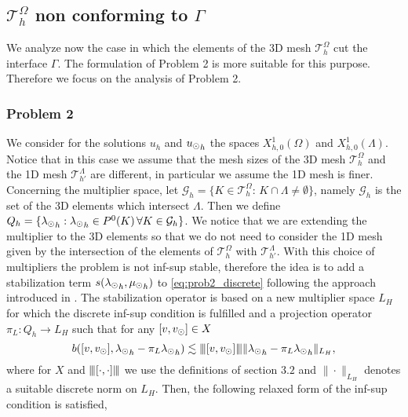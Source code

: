 \def\patch{\omega _j}
\subsection{$\mathcal{T}^{\Omega}_h$ non conforming to $\Gamma$} \label{sec:unfit2}
We analyze now the case in which the elements of the 3D mesh $\mathcal{T}^{\Omega}_h$ cut the interface $\Gamma$. The formulation of Problem 2 is more suitable for this purpose. 
Therefore we focus on the analysis of Problem 2.

\subsubsection{Problem 2} We consider for the solutions $u_h$ and ${u_{\odot}}_h$ the spaces $X_{h,0}^1(\Omega)$ and $X_{h,0}^1(\Lambda)$. Notice that in this case we assume that the mesh sizes of the 3D mesh $\mathcal{T}^{\Omega}_h$ and the 1D mesh $\mathcal{T}^{\Lambda}_{h'}$ are different, in particular we assume the 1D mesh is finer. Concerning the multiplier space, let $\mathcal{G}_h = \{K \in \mathcal{T}^{\Omega}_h: \, K\cap \Lambda \neq \emptyset\}$, namely $\mathcal{G}_h$ is the set of the 3D elements which intersect $\Lambda$. Then we define $Q_h=\{{\lambda_{\odot}}_h : {\lambda_{\odot}}_h \in P^0(K) \, \forall K \in \mathcal{G}_h\}$. We notice that we are extending the multiplier to the 3D elements so that we do not need to consider the 1D mesh given by the intersection of the elements of $\mathcal{T}^{\Omega}_h$ with $\mathcal{T}^{\Lambda}_{h'}$. With this choice of multipliers the problem is not inf-sup stable, therefore the idea is to add a stabilization term $s({\lambda_{\odot}}_h, {\mu_{\odot}}_h)$ to \eqref{eq:prob2_discrete} following the approach introduced in \cite{burman2014}. The stabilization operator is based on a new multiplier space $L_H$ for which the discrete inf-sup condition is fulfilled and a projection operator $\pi_L: Q_h \rightarrow L_H$ such that for any $[v, v_{\odot}] \in X $
\begin{equation}\label{condition_pi_L}
b([v, \vd], {\ld}_h - \pi_L {\ld}_h) \lesssim \vertiii{[v,\vd]}\|{\ld}_h - \pi_L {\ld}_h\|_{L_H},
\end{equation}
where for $X$ and ${\left\vert\kern-0.25ex\left\vert\kern-0.25ex\left\vert [\cdot, \cdot] \right\vert\kern-0.25ex\right\vert\kern-0.25ex\right\vert}$ we use the definitions of section $3.2$ and $\|\cdot \|_{L_H}$ denotes a suitable discrete norm on $L_H$. Then, the following relaxed form of the inf-sup condition is satisfied,
